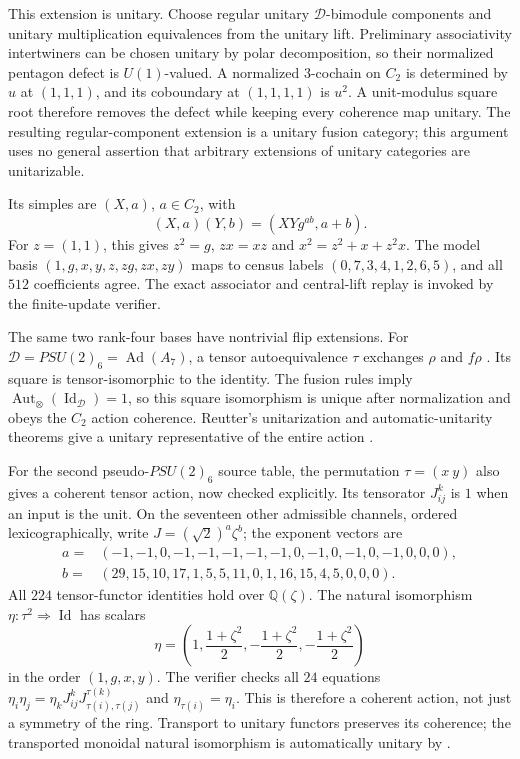 \documentclass[11pt,reqno]{amsart}
\theoremstyle{definition}
\theoremstyle{remark}
\newcommand{\Q}{\mathbb Q}
\begin{document}
This extension is unitary. Choose regular unitary $\mathcal D$-bimodule components and unitary multiplication equivalences from the unitary lift. Preliminary associativity intertwiners can be chosen unitary by polar decomposition, so their normalized pentagon defect is $U(1)$-valued. A normalized $3$-cochain on $C_2$ is determined by $u$ at $(1,1,1)$, and its coboundary at $(1,1,1,1)$ is $u^2$. A unit-modulus square root therefore removes the defect while keeping every coherence map unitary. The resulting regular-component extension is a unitary fusion category; this argument uses no general assertion that arbitrary extensions of unitary categories are unitarizable.

Its simples are $(X,a)$, $a\in C_2$, with
\[
(X,a)(Y,b)=(XYg^{ab},a+b).
\]
For $z=(1,1)$, this gives $z^2=g$, $zx=xz$ and $x^2=z^2+x+z^2x$. The model basis $(1,g,x,y,z,zg,zx,zy)$ maps to census labels $(0,7,3,4,1,2,6,5)$, and all $512$ coefficients agree. The exact associator and central-lift replay is invoked by the finite-update verifier.


The same two rank-four bases have nontrivial flip extensions. For $\mathcal D=PSU(2)_6=\operatorname{Ad}(A_7)$, a tensor autoequivalence $\tau$ exchanges $\rho$ and $f\rho$ \cite[Lemma~4.10]{EdieADE}. Its square is tensor-isomorphic to the identity. The fusion rules imply $\operatorname{Aut}_\otimes(\operatorname{Id}_{\mathcal D})=1$, so this square isomorphism is unique after normalization and obeys the $C_2$ action coherence. Reutter's unitarization and automatic-unitarity theorems give a unitary representative of the entire action \cite[Theorems~1--2]{Reutter}.

For the second pseudo-$PSU(2)_6$ source table, the permutation $\tau=(x\ y)$ also gives a coherent tensor action, now checked explicitly. Its tensorator $J_{ij}^k$ is $1$ when an input is the unit. On the seventeen other admissible channels, ordered lexicographically, write $J=(\sqrt2)^a\zeta^b$; the exponent vectors are
\[
\begin{split}
a={}&(-1,-1,0,-1,-1,-1,-1,-1,0,-1,0,-1,0,-1,0,0,0),\\
b={}&(29,15,10,17,1,5,5,11,0,1,16,15,4,5,0,0,0).
\end{split}
\]
All $224$ tensor-functor identities hold over $\Q(\zeta)$. The natural isomorphism $\eta:\tau^2\Rightarrow\operatorname{Id}$ has scalars
\[
\eta=\left(1,\frac{1+\zeta^2}{2},-\frac{1+\zeta^2}{2},-\frac{1+\zeta^2}{2}\right)
\]
in the order $(1,g,x,y)$. The verifier checks all $24$ equations
$\eta_i\eta_j=\eta_kJ_{ij}^kJ_{\tau(i),\tau(j)}^{\tau(k)}$
and $\eta_{\tau(i)}=\eta_i$. This is therefore a coherent action, not just a symmetry of the ring. Transport to unitary functors preserves its coherence; the transported monoidal natural isomorphism is automatically unitary by \cite[Theorems~1--2]{Reutter}.
\end{document}
